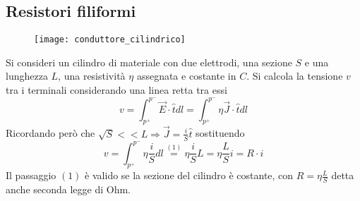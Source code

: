 \subsection{Resistori filiformi}
\begin{figure}[H]
\centering
\texttt{[image: conduttore\_cilindrico]}
\end{figure}
Si consideri un cilindro di materiale con due elettrodi, una sezione $S$ e una lunghezza 
$L$, una resistività $\eta$ assegnata e costante in $C$.
Si calcola la tensione $v$ tra i terminali considerando una linea retta tra essi
$$
v = \int_{p^+}^{p^-} \vec{E}\cdot\hat{t}dl = \int_{p^+}^{p^-} \eta\vec{J}\cdot\hat{t}dl
$$
Ricordando però che $\sqrt{S} << L \Rightarrow \vec{J} = \frac{i}{S}\hat{t}$ sostituendo
$$
v = \int_{p^+}^{p^-} \eta\frac{i}{S}dl \stackrel{(1)}{=} \eta\frac{i}{S} L = \eta\frac{L}{S}i = R\cdot i
$$
Il passaggio $(1)$ è valido se la sezione del cilindro è costante, con $R=\eta\frac{L}{S}$ 
detta anche seconda legge di Ohm.

\newpage
